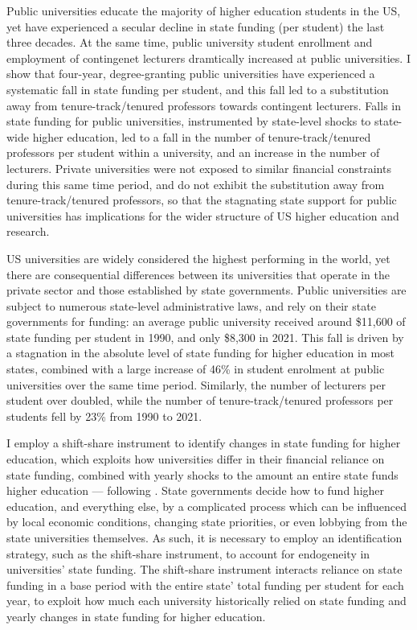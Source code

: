 Public universities educate the majority of higher education students in the US, yet have experienced a secular decline in state funding (per student) the last three decades.
At the same time, public university student enrollment and employment of contingenet lecturers dramtically increased at public universities.
I show that four-year, degree-granting public universities have experienced a systematic fall in state funding per student, and this fall led to a substitution away from tenure-track/tenured professors towards contingent lecturers.
Falls in state funding for public universities, instrumented by state-level shocks to state-wide higher education, led to a fall in the number of tenure-track/tenured professors per student within a university, and an increase in the number of lecturers.
Private universities were not exposed to similar financial constraints during this same time period, and do not exhibit the substitution away from tenure-track/tenured professors, so that the stagnating state support for public universities has implications for the wider structure of US higher education and research.

US universities are widely considered the highest performing in the world, yet there are consequential differences between its universities that operate in the private sector and those established by state governments.
Public universities are subject to numerous state-level administrative laws, and rely on their state governments for funding: an average public university received around \$11,600 of state funding per student in 1990, and only \$8,300 in 2021.
This fall is driven by a stagnation in the absolute level of state funding for higher education in most states, combined with a large increase of 46\% in student enrolment at public universities over the same time period.
Similarly, the number of lecturers per student over doubled, while the number of tenure-track/tenured professors per students fell by 23\% from 1990 to 2021.

I employ a shift-share instrument to identify changes in state funding for higher education, which exploits how universities differ in their financial reliance on state funding, combined with yearly shocks to the amount an entire state funds higher education --- following \cite{NBERw23736,NBERw27885}.
State governments decide how to fund higher education, and everything else, by a complicated process which can be influenced by local economic conditions, changing state priorities, or even lobbying from the state universities themselves.
As such, it is necessary to employ an identification strategy, such as the shift-share instrument, to account for endogeneity in universities' state funding.
The shift-share instrument interacts reliance on state funding in a base period with the entire state' total funding per student for each year, to exploit how much each university historically relied on state funding and yearly changes in state funding for higher education.

